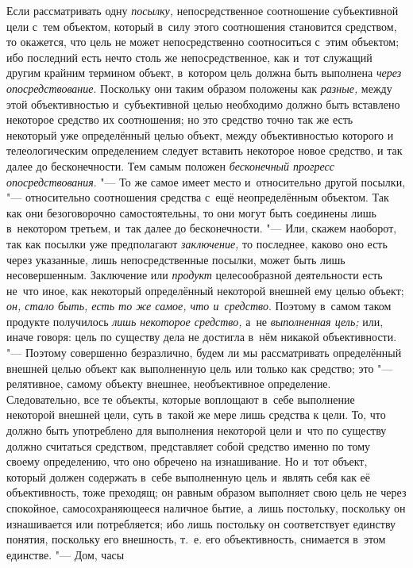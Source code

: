 Если рассматривать одну
{\em посылку,}
непосредственное соотношение субъективной цели с~тем
объектом, который в~силу этого соотношения становится средством, то
окажется, что цель не может непосредственно соотноситься с~этим объектом;
ибо последний есть нечто столь же непосредственное, как и~тот служащий
другим крайним термином объект, в~котором цель должна быть выполнена
{\em через опосредствование}.
Поскольку они таким образом положены как
{\em разные,} между этой
объективностью и~субъективной целью необходимо должно быть вставлено
некоторое средство их соотношения; но это средство точно так же есть
некоторый уже определённый целью объект, между объективностью которого и
телеологическим определением следует вставить некоторое новое средство, и
так далее до бесконечности. Тем самым положен
{\em бесконечный прогресс}
{\em опосредствования}. "---
То же самое имеет место и~относительно другой
посылки, "--- относительно соотношения средства с~ещё
неопределённым объектом. Так как они безоговорочно самостоятельны, то они
могут быть соединены лишь в~некотором третьем, и~так далее до
бесконечности. "--- Или, скажем наоборот, так как посылки уже
предполагают {\em заключение,}
то последнее, каково оно есть через указанные, лишь
непосредственные посылки, может быть лишь несовершенным. Заключение или
{\em продукт} целесообразной деятельности есть не~что иное, как некоторый
определённый некоторой внешней ему целью объект;
{\em он, стало быть, есть то же самое,
что и~средство}. Поэтому в~самом таком продукте получилось
{\em лишь некоторое средство,} а~не {\em выполненная
цель;} или, иначе говоря: цель по существу дела не достигла
в~нём никакой объективности. "--- Поэтому совершенно
безразлично, будем ли мы рассматривать определённый внешней целью объект
как выполненную цель или только как средство; это
"--- релятивное, самому объекту внешнее, необъективное
определение. Следовательно, все те объекты, которые воплощают в~себе
выполнение некоторой внешней цели, суть в~такой же мере лишь средства к
цели. То, что должно быть употреблено для выполнения некоторой цели и~что
по существу должно считаться средством, представляет собой средство именно
по тому своему определению, что оно обречено на изнашивание. Но и~тот
объект, который должен содержать в~себе выполненную цель и~являть себя как
её объективность, тоже преходящ; он равным образом выполняет свою цель не
через спокойное, самосохраняющееся наличное бытие, а~лишь постольку,
поскольку он изнашивается или потребляется; ибо лишь постольку он
соответствует единству понятия, поскольку его внешность, т.~е. его
объективность, снимается в~этом единстве. "--- Дом, часы
